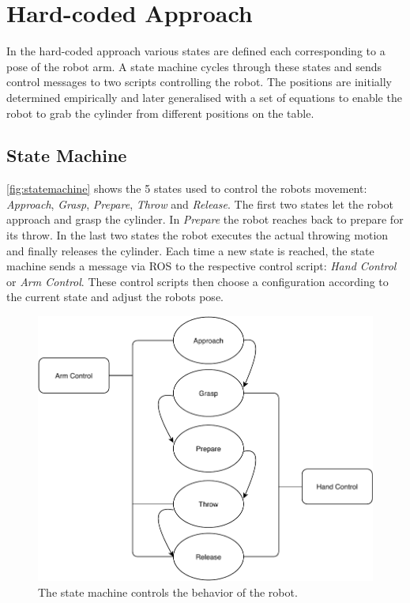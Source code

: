 \section{Hard-coded Approach}
\label{sec:hard-coded}
In the hard-coded approach various states are defined each corresponding to a pose of the robot arm.
A state machine cycles through these states and sends control messages to two scripts controlling the robot.
The positions are initially determined empirically and later generalised with a set of equations to enable the robot to grab the cylinder from different positions on the table.

\subsection{State Machine}
\autoref{fig:statemachine} shows the 5 states used to control the robots movement: \textit{Approach}, \textit{Grasp}, \textit{Prepare}, \textit{Throw} and \textit{Release}.
The first two states let the robot approach and grasp the cylinder.
In \textit{Prepare} the robot reaches back to prepare for its throw.
In the last two states the robot executes the actual throwing motion and finally releases the cylinder.
Each time a new state is reached, the state machine sends a message via ROS to the respective control script: \textit{Hand Control} or \textit{Arm Control}.
These control scripts then choose a configuration according to the current state and adjust the robots pose.

\begin{figure}[tpb]
\centering
	\includegraphics[width=0.9\linewidth]{figures/state.pdf} 
	\caption{The state machine controls the behavior of the robot.}
	\label{fig:statemachine}
\end{figure}


